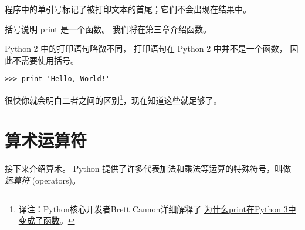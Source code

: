 %

程序中的单引号标记了被打印文本的首尾；它们不会出现在结果中。
    

    


括号说明 print 是一个函数。 我们将在第三章介绍函数。

 
 


Python 2 中的打印语句略微不同， 打印语句在 Python 2 中并不是一个函数， 因此不需要使用括号。

\begin{lstlisting}
>>> print 'Hello, World!'
\end{lstlisting}

%

很快你就会明白二者之间的区别\footnote{译注：Python核心开发者Brett Cannon详细解释了 \href{http://codingpy.com/article/why-print-became-a-function-in-python-3/}{为什么print在Python 3中变成了函数}。 }，现在知道这些就足够了。

\section{算术运算符}
  
  


接下来介绍算术。  
Python 提供了许多代表加法和乘法等运算的特殊符号，叫做 {\em 运算符} (operators)。


